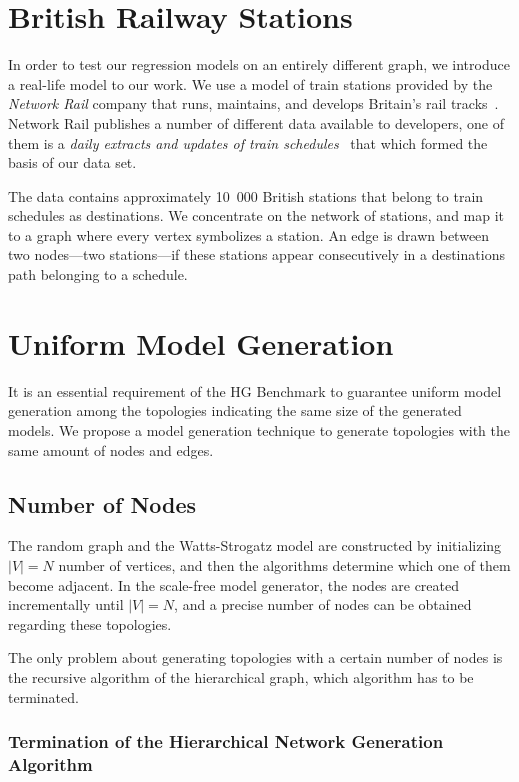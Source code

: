 \section{British Railway Stations}

In order to test our regression models on an entirely different graph, we introduce a real-life model to our work. We use a model of train stations provided by the \textit{Network Rail} company that runs, maintains, and develops Britain's rail tracks~\cite{network_rail}. Network Rail publishes a number of different data available to developers, one of them is a \textit{daily extracts and updates of train schedules}~\cite{schedules_data} that which formed the basis of our data set.

The data contains approximately 10~000 British stations that belong to train schedules as destinations. We concentrate on the network of stations, and map it to a graph where every vertex symbolizes a station. An edge is drawn between two nodes---\ie two stations---if these stations appear consecutively in a destinations path belonging to a schedule.

\section{Uniform Model Generation}

It is an essential requirement of the HG Benchmark to guarantee uniform model generation among the topologies indicating the same size of the generated models. We propose a model generation technique to generate topologies with the same amount of nodes and edges.

\subsection{Number of Nodes}

The random graph and the Watts-Strogatz model are constructed by initializing $|V| = N$ number of vertices, and then the algorithms determine which one of them become adjacent. In the scale-free model generator, the nodes are created incrementally until $|V| = N$, and a precise number of nodes can be obtained regarding these topologies.

The only problem about generating topologies with a certain number of nodes is the recursive algorithm of the hierarchical graph, which algorithm has to be terminated.

\subsubsection{Termination of the Hierarchical Network Generation Algorithm}\label{sec:hierarcical_contribution}

